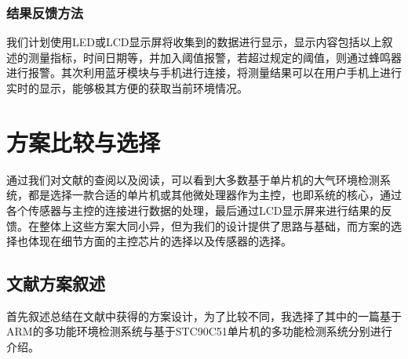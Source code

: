 \documentclass[a4paper, 11pt]{article} %
\begin{document}
\subsubsection{结果反馈方法}
\par{} 我们计划使用LED或LCD显示屏将收集到的数据进行显示，显示内容包括以上叙述的测量指标，时间日期等，并加入阈值报警，若超过规定的阈值，则通过蜂鸣器进行报警。其次利用蓝牙模块与手机进行连接，将测量结果可以在用户手机上进行实时的显示，能够极其方便的获取当前环境情况。

\section{方案比较与选择}\label{sect1}
\par{} 通过我们对文献的查阅以及阅读，可以看到大多数基于单片机的大气环境检测系统，都是选择一款合适的单片机或其他微处理器作为主控，也即系统的核心，通过各个传感器与主控的连接进行数据的处理，最后通过LCD显示屏来进行结果的反馈。在整体上这些方案大同小异，但为我们的设计提供了思路与基础，而方案的选择也体现在细节方面的主控芯片的选择以及传感器的选择。
\subsection{文献方案叙述}
\par{} 首先叙述总结在文献中获得的方案设计，为了比较不同，我选择了其中的一篇基于ARM的多功能环境检测系统与基于STC90C51单片机的多功能检测系统分别进行介绍。
\end{document}
